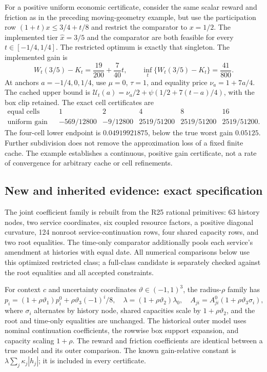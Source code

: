 For a positive uniform economic certificate, consider the same scalar reward and friction as in the preceding moving-geometry example, but use the participation row
$(1+t)x\leq3/4+t/8$ and restrict the comparator to $x=1/2$. The implemented tier $\widehat x=3/5$ and the comparator are both feasible for every $t\in[-1/4,1/4]$. The restricted optimum is exactly that singleton. The implemented gain is
\[
 W_t(3/5)-K_t=\frac{19}{200}+\frac{7}{40}t,
 \qquad \inf_t\{W_t(3/5)-K_t\}=\frac{41}{800}.
\]
At anchors $a=-1/4,0,1/4$, use $\mu=0$, $\tau=1$, and equality price $\nu_a=1+7a/4$. The cached upper bound is
$\mathcal U_t(a)=\nu_a/2+\psi(1/2+7(t-a)/4)$, with the box clip retained. The exact cell certificates are
\[
 \begin{array}{cccccc}
 \text{equal cells}&1&2&4&8&16\\ \hline
 \text{uniform gain lower bound}&-569/12800&-9/12800&2519/51200&2519/51200&2519/51200.
 \end{array}
\]
The four-cell lower endpoint is $0.04919921875$, below the true worst gain $0.05125$. Further subdivision does not remove the approximation loss of a fixed finite cache. The example establishes a continuous, positive gain certificate, not a rate of convergence for arbitrary cache or cell refinements.

\subsection{New and inherited evidence: exact specification}\label{ec:r27-design}
The joint coefficient family is rebuilt from the R25 rational primitives: 63 history nodes, two service coordinates, six coupled resource factors, a positive diagonal curvature, 124 nonroot service-continuation rows, four shared capacity rows, and two root equalities. The time-only comparator additionally pools each service's amendment at histories with equal date. All numerical comparisons below use this optimized restricted class; a full-class candidate is separately checked against the root equalities and all accepted constraints.

For context $c$ and uncertainty coordinates $\vartheta\in(-1,1)^3$, the radius-$\rho$ family has
\[
 p_i=(1+\rho\vartheta_1)p_i^0+\rho\vartheta_3(-1)^i/8,
 \quad\lambda=(1+\rho\vartheta_2)\lambda_0,
 \quad A_{ji}=A^0_{ji}(1+\rho\vartheta_3\sigma_i),
\]
where $\sigma_i$ alternates by history node, shared capacities scale by $1+\rho\vartheta_2$, and the root and time-only equalities are unchanged. The historical outer model uses nominal continuation coefficients, the rowwise box support expansion, and capacity scaling $1+\rho$. The reward and friction coefficients are identical between a true model and its outer comparison. The known gain-relative constant is $\lambda\sum_j\kappa_j|h_j|$; it is included in every certificate.

